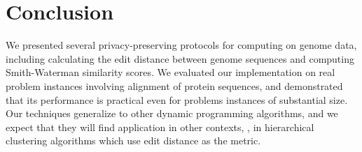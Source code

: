 \section{Conclusion}

We presented several privacy-preserving protocols for computing on genome
data, including calculating the edit distance between genome sequences
and computing Smith-Waterman similarity scores.  We evaluated our
implementation on real problem instances involving alignment of protein
sequences, and demonstrated that its performance is practical even for
problems instances of substantial size.  Our techniques generalize to
other dynamic programming algorithms, and we expect that they will find
application in other contexts, \eg, in hierarchical clustering algorithms
which use edit distance as the metric.

